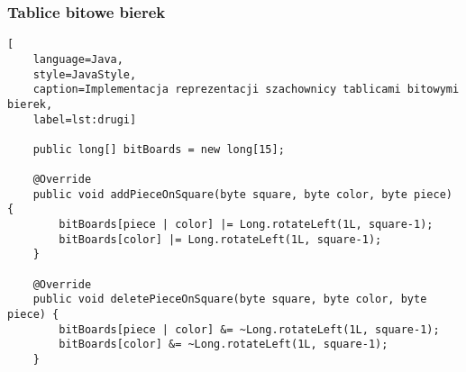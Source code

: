 \subsubsection{Tablice bitowe bierek}

\begin{lstlisting}[
    language=Java,
    style=JavaStyle,
    caption=Implementacja reprezentacji szachownicy tablicami bitowymi bierek,
    label=lst:drugi]

    public long[] bitBoards = new long[15];

    @Override
    public void addPieceOnSquare(byte square, byte color, byte piece) {
        bitBoards[piece | color] |= Long.rotateLeft(1L, square-1);
        bitBoards[color] |= Long.rotateLeft(1L, square-1);
    }

    @Override
    public void deletePieceOnSquare(byte square, byte color, byte piece) {
        bitBoards[piece | color] &= ~Long.rotateLeft(1L, square-1);
        bitBoards[color] &= ~Long.rotateLeft(1L, square-1);
    }

\end{lstlisting}

